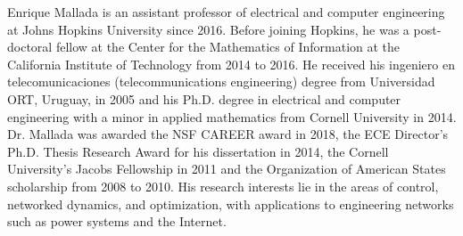 \begin{IEEEbiography}{Enrique Mallada} is an assistant professor of electrical and computer engineering at Johns Hopkins University since 2016. Before joining Hopkins, he was a post-doctoral fellow at the Center for the Mathematics of Information at the California Institute of Technology from 2014 to 2016. He received his ingeniero en telecomunicaciones (telecommunications engineering) degree from Universidad ORT, Uruguay, in 2005 and his Ph.D. degree in electrical and computer engineering with a minor in applied mathematics from Cornell University in 2014. Dr. Mallada was awarded the NSF CAREER award in 2018, the ECE Director's Ph.D. Thesis Research Award for his dissertation in 2014, the Cornell University's Jacobs Fellowship in 2011 and the Organization of American States scholarship from 2008 to 2010. His research interests lie in the areas of control, networked dynamics, and optimization, with applications to engineering networks such as power systems and the Internet.
\end{IEEEbiography}